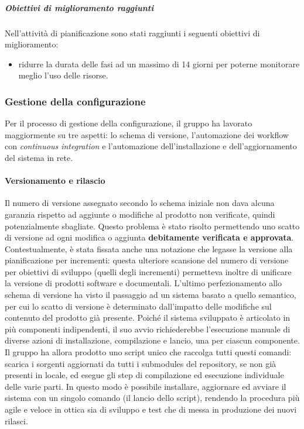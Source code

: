 				\subparagraph{Obiettivi di miglioramento raggiunti}
					Nell'attività di pianificazione sono stati raggiunti i seguenti obiettivi di miglioramento:
					\begin{itemize}
						\item ridurre la durata delle fasi ad un massimo di 14 giorni per poterne monitorare meglio l'uso delle risorse.
					\end{itemize}
		
		\subsubsection{Gestione della configurazione}
			Per il processo di gestione della configurazione, il gruppo ha lavorato maggiormente su tre aspetti: lo schema di versione, l'automazione dei workflow con \textit{continuous integration} e l'automazione dell'installazione e dell'aggiornamento del sistema in rete.
			
			\paragraph{Versionamento e rilascio}
				Il numero di versione assegnato secondo lo schema iniziale non dava alcuna garanzia rispetto ad aggiunte o modifiche al prodotto non verificate, quindi potenzialmente sbagliate. Questo problema è stato risolto permettendo uno scatto di versione ad ogni modifica o aggiunta \textbf{debitamente verificata e approvata}. Contestualmente, è stata fissata anche una notazione che legasse la versione alla pianificazione per incrementi: questa ulteriore scansione del numero di versione per obiettivi di sviluppo (quelli degli incrementi) permetteva inoltre di unificare la versione di prodotti software e documentali. L'ultimo perfezionamento allo schema di versione ha visto il passaggio ad un sistema basato a quello semantico, per cui lo scatto di versione è determinato dall'impatto delle modifiche sul contenuto del prodotto già presente.
				\newline
				Poiché il sistema sviluppato è articolato in più componenti indipendenti, il suo avvio richiederebbe l'esecuzione manuale di diverse azioni di installazione, compilazione e lancio, una per ciascun componente. Il gruppo ha allora prodotto uno script unico che raccolga tutti questi comandi: scarica i sorgenti aggiornati da tutti i submodules del repository, se non già presenti in locale, ed esegue gli step di compilazione ed esecuzione individuale delle varie parti. In questo modo è possibile installare, aggiornare ed avviare il sistema con un singolo comando (il lancio dello script), rendendo la procedura più agile e veloce in ottica sia di sviluppo e test che di messa in produzione dei nuovi rilasci.
				
